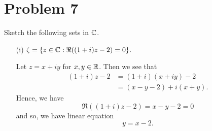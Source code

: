 \documentclass[a4paper]{article}
\begin{document}
    \section*{Problem 7}
    Sketch the following sets in \( \mathbb{C}  \).
    \begin{enumerate}
        \item[(i)] \( \zeta = \{ z \in \mathbb{C} : \Re((1+i)z - 2) = 0 \}.  \)

            \begin{solution}
            Let \( z = x + iy  \) for \( x,y \in \mathbb{R}  \). Then we see that 
            \begin{align*}
                (1 + i)z - 2 &= (1+i)(x + iy) - 2   \\
                             &= (x - y - 2) + i(x+y).
            \end{align*}
            Hence, we have 
            \[  \Re((1+i)z - 2) = x - y - 2 = 0   \]
            and so, we have linear equation 
            \[  y = x - 2. \]
            

\end{solution}
\end{enumerate}
\end{document}
